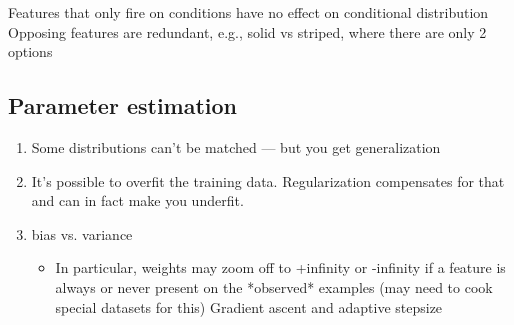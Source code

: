 \documentclass[11pt,letterpaper]{article}
\begin{document}
Features that only fire on conditions have no effect on conditional distribution
Opposing features are redundant, e.g., solid vs striped, where there are only 2 options



\subsection{Parameter estimation}
\begin{enumerate}
\item Some distributions can't be matched --- but you get generalization
\item It's possible to overfit the training data.  Regularization compensates for that and can in fact make you underfit.
\item bias vs. variance
\begin{itemize}
\item In particular, weights may zoom off to +infinity or -infinity if a feature is always or never present on the *observed* examples (may need to cook special datasets for this)
Gradient ascent and adaptive stepsize
\end{itemize}
\end{enumerate}
\end{document}
